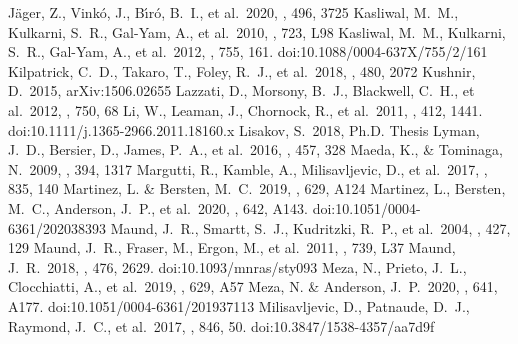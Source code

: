 \documentclass[twocolumn, linenumbers]{aastex62}
\begin{document}
\begin{thebibliography}{99}
 J{\"a}ger, Z., Vink{\'o}, J., B{\'\i}r{\'o}, B.~I., et al.\ 2020, \mnras, 496, 3725
 Kasliwal, M.~M., Kulkarni, S.~R., Gal-Yam, A., et al.\ 2010, \apjl, 723, L98
 Kasliwal, M.~M., Kulkarni, S.~R., Gal-Yam, A., et al.\ 2012, \apj, 755, 161. doi:10.1088/0004-637X/755/2/161
 Kilpatrick, C.~D., Takaro, T., Foley, R.~J., et al.\ 2018, \mnras, 480, 2072
 Kushnir, D.\ 2015, arXiv:1506.02655
 Lazzati, D., Morsony, B.~J., Blackwell, C.~H., et al.\ 2012, \apj, 750, 68
 Li, W., Leaman, J., Chornock, R., et al.\ 2011, \mnras, 412, 1441. doi:10.1111/j.1365-2966.2011.18160.x
 Lisakov, S.\ 2018, Ph.D. Thesis
 Lyman, J.~D., Bersier, D., James, P.~A., et al.\ 2016, \mnras, 457, 328
 Maeda, K., \& Tominaga, N.\ 2009, \mnras, 394, 1317
 Margutti, R., Kamble, A., Milisavljevic, D., et al.\ 2017, \apj, 835, 140
 Martinez, L. \& Bersten, M.~C.\ 2019, \aap, 629, A124
 Martinez, L., Bersten, M.~C., Anderson, J.~P., et al.\ 2020, \aap, 642, A143. doi:10.1051/0004-6361/202038393
 Maund, J.~R., Smartt, S.~J., Kudritzki, R.~P., et al.\ 2004, \nat, 427, 129
 Maund, J.~R., Fraser, M., Ergon, M., et al.\ 2011, \apjl, 739, L37
 Maund, J.~R.\ 2018, \mnras, 476, 2629. doi:10.1093/mnras/sty093
 Meza, N., Prieto, J.~L., Clocchiatti, A., et al.\ 2019, \aap, 629, A57
 Meza, N. \& Anderson, J.~P.\ 2020, \aap, 641, A177. doi:10.1051/0004-6361/201937113
 Milisavljevic, D., Patnaude, D.~J., Raymond, J.~C., et al.\ 2017, \apj, 846, 50. doi:10.3847/1538-4357/aa7d9f

\end{thebibliography}
\end{document}
